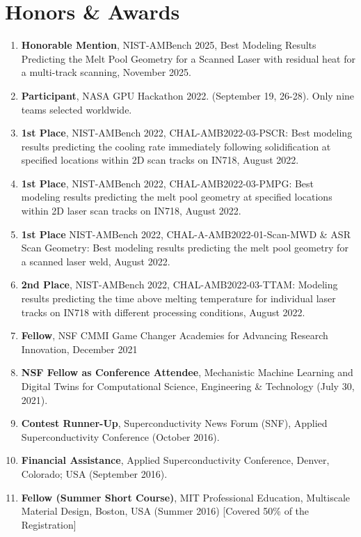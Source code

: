 \documentclass[11pt, letterpaper]{article}
\begin{document}
\section{Honors \& Awards}
   \begin{enumerate}[label=\arabic*., itemsep=-1pt, topsep=2pt]
        \item \textbf{Honorable Mention}, NIST-AMBench 2025, Best Modeling Results Predicting the Melt Pool Geometry for a Scanned Laser with residual heat for a multi-track scanning, November 2025.
        \item \textbf{Participant}, NASA GPU Hackathon 2022. (September 19, 26-28). Only nine teams selected worldwide.
        \item \textbf{1st Place}, NIST-AMBench 2022, CHAL-AMB2022-03-PSCR: Best modeling results predicting the cooling rate immediately following solidification at specified locations within 2D scan tracks on IN718, August 2022.
        \item \textbf{1st Place}, NIST-AMBench 2022, CHAL-AMB2022-03-PMPG: Best modeling results predicting the melt pool geometry at specified locations within 2D laser scan tracks on IN718, August 2022.
        \item \textbf{1st Place} NIST-AMBench 2022, CHAL-A-AMB2022-01-Scan-MWD \& ASR Scan Geometry: Best modeling results predicting the melt pool geometry for a scanned laser weld, August 2022.
        \item \textbf{2nd Place},  NIST-AMBench 2022, CHAL-AMB2022-03-TTAM: Modeling results predicting the time above melting temperature for individual laser tracks on IN718 with different processing conditions, August 2022.
        \item \textbf{Fellow}, NSF CMMI Game Changer Academies for Advancing Research Innovation, December 2021
        \item \textbf {NSF Fellow as Conference Attendee}, Mechanistic Machine Learning and Digital Twins for Computational Science, Engineering \& Technology (July 30, 2021).
        \item \textbf{Contest Runner-Up}, Superconductivity News Forum (SNF), Applied Superconductivity Conference (October 2016).
        \item \textbf{Financial Assistance}, Applied Superconductivity Conference, Denver, Colorado; USA (September 2016).
        \item \textbf{Fellow (Summer Short Course)}, MIT Professional Education, Multiscale Material Design, Boston, USA (Summer 2016) [Covered 50\% of the Registration]

\end{enumerate}
\end{document}
